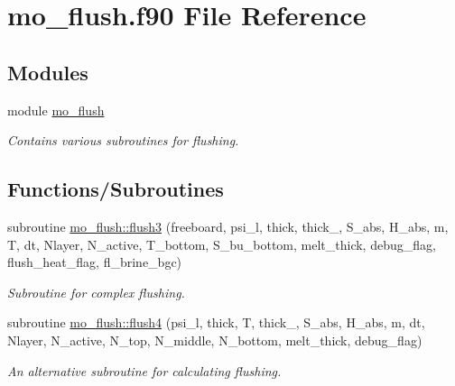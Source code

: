 \hypertarget{mo__flush_8f90}{
\section{mo\_\-flush.f90 File Reference}
\label{mo__flush_8f90}
}
\subsection*{Modules}
\begin{DoxyCompactItemize}
\item 
module \hyperlink{namespacemo__flush}{mo\_\-flush}


\begin{DoxyCompactList}\small\item\em Contains various subroutines for flushing. \item\end{DoxyCompactList}

\end{DoxyCompactItemize}
\subsection*{Functions/Subroutines}
\begin{DoxyCompactItemize}
\item 
subroutine \hyperlink{namespacemo__flush_a405b14313a6162816fc9f7cc30501b2e}{mo\_\-flush::flush3} (freeboard, psi\_\-l, thick, thick\_, S\_\-abs, H\_\-abs, m, T, dt, Nlayer, N\_\-active, T\_\-bottom, S\_\-bu\_\-bottom, melt\_\-thick, debug\_\-flag, flush\_\-heat\_\-flag, fl\_\-brine\_\-bgc)
\begin{DoxyCompactList}\small\item\em Subroutine for complex flushing. \item\end{DoxyCompactList}\item 
subroutine \hyperlink{namespacemo__flush_aa1fdebea288d239b56f2db40538991f3}{mo\_\-flush::flush4} (psi\_\-l, thick, T, thick\_, S\_\-abs, H\_\-abs, m, dt, Nlayer, N\_\-active, N\_\-top, N\_\-middle, N\_\-bottom, melt\_\-thick, debug\_\-flag)
\begin{DoxyCompactList}\small\item\em An alternative subroutine for calculating flushing. \item\end{DoxyCompactList}\end{DoxyCompactItemize}
